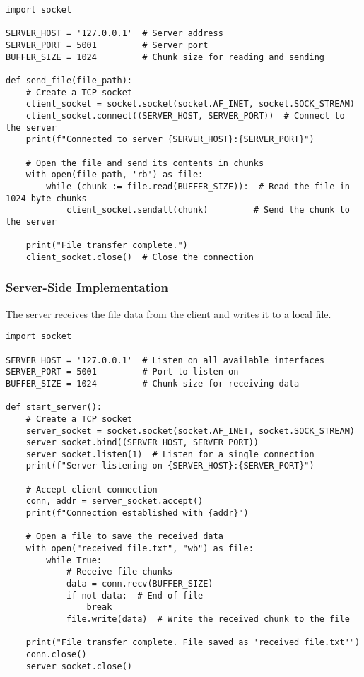 \documentclass{article}
\begin{document}
\begin{lstlisting}[caption=Client-Side File Transfer, label=lst:client]
import socket

SERVER_HOST = '127.0.0.1'  # Server address
SERVER_PORT = 5001         # Server port
BUFFER_SIZE = 1024         # Chunk size for reading and sending

def send_file(file_path):
    # Create a TCP socket
    client_socket = socket.socket(socket.AF_INET, socket.SOCK_STREAM)
    client_socket.connect((SERVER_HOST, SERVER_PORT))  # Connect to the server
    print(f"Connected to server {SERVER_HOST}:{SERVER_PORT}")

    # Open the file and send its contents in chunks
    with open(file_path, 'rb') as file:
        while (chunk := file.read(BUFFER_SIZE)):  # Read the file in 1024-byte chunks
            client_socket.sendall(chunk)         # Send the chunk to the server
    
    print("File transfer complete.")
    client_socket.close()  # Close the connection
\end{lstlisting}

\subsubsection*{Server-Side Implementation}

The server receives the file data from the client and writes it to a local file. \\

\begin{lstlisting}[caption=Server-Side File Transfer, label=lst:server]
import socket

SERVER_HOST = '127.0.0.1'  # Listen on all available interfaces
SERVER_PORT = 5001         # Port to listen on
BUFFER_SIZE = 1024         # Chunk size for receiving data

def start_server():
    # Create a TCP socket
    server_socket = socket.socket(socket.AF_INET, socket.SOCK_STREAM)
    server_socket.bind((SERVER_HOST, SERVER_PORT))
    server_socket.listen(1)  # Listen for a single connection
    print(f"Server listening on {SERVER_HOST}:{SERVER_PORT}")

    # Accept client connection
    conn, addr = server_socket.accept()
    print(f"Connection established with {addr}")

    # Open a file to save the received data
    with open("received_file.txt", "wb") as file:
        while True:
            # Receive file chunks
            data = conn.recv(BUFFER_SIZE)
            if not data:  # End of file
                break
            file.write(data)  # Write the received chunk to the file
    
    print("File transfer complete. File saved as 'received_file.txt'")
    conn.close()
    server_socket.close()
\end{lstlisting}
\end{document}
